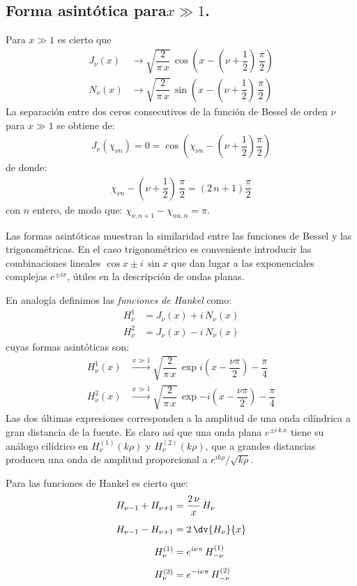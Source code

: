 \subsection{Forma asintótica para\texorpdfstring{$x \gg 1$}{x >> 1}.}
Para $x \gg 1$ es cierto que
\begin{align*}
J_{\nu} (x) &\to \sqrt{\dfrac{2}{\pi \, x}} \, \cos \left( x - \left( \nu + \dfrac{1}{2} \right) \, \dfrac{\pi}{2} \right) \\[0.5em]
N_{\nu} (x) &\to \sqrt{\dfrac{2}{\pi \, x}} \, \sin \left( x - \left( \nu + \dfrac{1}{2} \right) \, \dfrac{\pi}{2} \right)
\end{align*}
La separación entre dos ceros consecutivos de la función de Bessel de orden $\nu$ para $x \gg 1$ se obtiene de:
\begin{align*}
J_{\nu}(\chi_{\nu n}) = 0 = \cos (\chi_{\nu n} - \left( \nu + \dfrac{1}{2} \right) \dfrac{\pi}{2})
\end{align*}
de donde:
\begin{align*}
\chi_{\nu n} - \left( \nu + \dfrac{1}{2} \right) \, \dfrac{\pi}{2} = (2 \, n + 1) \dfrac{\pi}{2}
\end{align*}
con $n$ entero, de modo que: $\chi_{\nu, n+1} - \chi_{nu,n} = \pi$.
\par
Las formas asintóticas muestran la similaridad entre las funciones de Bessel y las trigonométricas. En el caso trigonométrico es conveniente introducir las combinaciones lineales $\cos x \pm i \, \sin x$ que dan lugar a las exponenciales complejas $e^{\pm i x}$, útiles en la descripción de ondas planas. 
\par
En analogía  definimos las \emph{funciones de Hankel} como:
\begin{align*}
H_{\nu}^{1} &= J_{\nu} (x) + i \, N_{\nu} (x) \\[0.5em]
H_{\nu}^{2} &= J_{\nu} (x) - i \, N_{\nu} (x)  
\end{align*}
cuyas formas asintóticas son:
\begin{align*}
H_{\nu}^{1}(x) & \xrightarrow{\text{$x \gg 1$}} \sqrt{\dfrac{2}{\pi \, x}} \, \exp{i \left( x - \dfrac{\nu \pi}{2}\right) - \dfrac{\pi}{4}} \\
H_{\nu}^{2}(x) & \xrightarrow{\text{$x \gg 1$}} \sqrt{\dfrac{2}{\pi \, x}} \, \exp{-i \left(x - \dfrac{\nu \pi}{2} \right) - \dfrac{\pi}{4}} 
\end{align*}
Las dos últimas expresiones corresponden a la amplitud de una onda cilíndrica a gran distancia de la fuente. Es claro así que una onda plana $e^{\pm i \, k \, x}$ tiene su análogo cilídrico en $H_{\nu}^{(1)} (k \rho)$ y $H_{\nu}^{(2)} (k \rho)$, que a grandes distancias producen una onda de amplitud proporcional a $e^{i k \rho} / \sqrt{k \rho}$.
\par
Para las funciones de Hankel es cierto que:
\begin{align*}
H_{\nu-1} + H_{\nu+1} &= \dfrac{2 \, \nu}{x} \, H_{\nu} \\[0.5em]
H_{\nu-1} - H_{\nu+1} &= 2 \, \dv{H_{\nu}}{x} \\[0.5em]
H_{\nu}^{(1)} &= e^{i \nu \pi} \, H_{-\nu}^{(1)} \\[0.5em]
H_{\nu}^{(2)} &= e^{-i \nu \pi} \, H_{-\nu}^{(2)} 
\end{align*}
